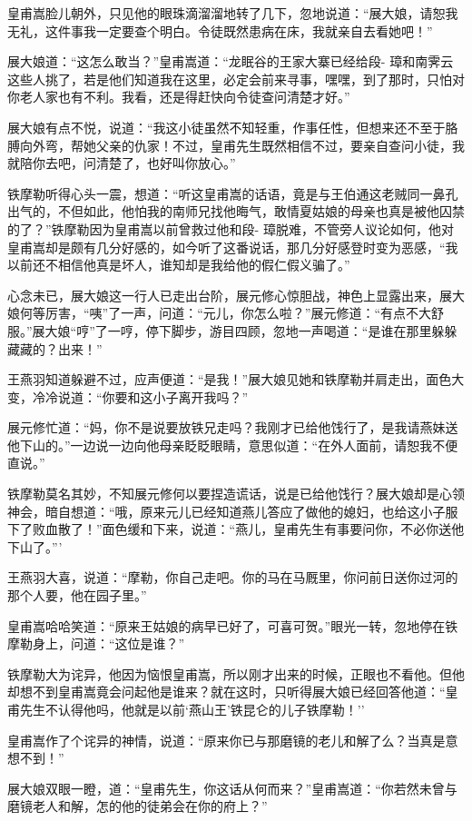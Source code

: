\documentclass[12pt,oneside]{book}
\begin{document}
皇甫嵩脸儿朝外，只见他的眼珠滴溜溜地转了几下，忽地说道：``展大娘，请恕我无礼，这件事我一定要查个明白。令徒既然患病在床，我就亲自去看她吧！''

展大娘道：``这怎么敢当？''皇甫嵩道：``龙眠谷的王家大寨已经给段-
璋和南霁云这些人挑了，若是他们知道我在这里，必定会前来寻事，嘿嘿，到了那时，只怕对你老人家也有不利。我看，还是得赶快向令徒查问清楚才好。''

展大娘有点不悦，说道：``我这小徒虽然不知轻重，作事任性，但想来还不至于胳膊向外弯，帮她父亲的仇家！不过，皇甫先生既然相信不过，要亲自查问小徒，我就陪你去吧，问清楚了，也好叫你放心。''

铁摩勒听得心头一震，想道：``听这皇甫嵩的话语，竟是与王伯通这老贼同一鼻孔出气的，不但如此，他怕我的南师兄找他晦气，敢情夏姑娘的母亲也真是被他囚禁的了？''铁摩勒因为皇甫嵩以前曾救过他和段-
璋脱难，不管旁人议论如何，他对皇甫嵩却是颇有几分好感的，如今听了这番说话，那几分好感登时变为恶感，``我以前还不相信他真是坏人，谁知却是我给他的假仁假义骗了。''

心念未已，展大娘这一行人已走出台阶，展元修心惊胆战，神色上显露出来，展大娘何等厉害，``咦''了一声，问道：``元儿，你怎么啦？''展元修道：``有点不大舒服。''展大娘``哼''了一哼，停下脚步，游目四顾，忽地一声喝道：``是谁在那里躲躲藏藏的？出来！''

王燕羽知道躲避不过，应声便道：``是我！''展大娘见她和铁摩勒并肩走出，面色大变，冷冷说道：``你要和这小子离开我吗？''

展元修忙道：``妈，你不是说要放铁兄走吗？我刚才已给他饯行了，是我请燕妹送他下山的。''一边说一边向他母亲眨眨眼睛，意思似道：``在外人面前，请恕我不便直说。''

铁摩勒莫名其妙，不知展元修何以要捏造谎话，说是已给他饯行？展大娘却是心领神会，暗自想道：``哦，原来元儿已经知道燕儿答应了做他的媳妇，也给这小子服下了败血散了！''面色缓和下来，说道：``燕儿，皇甫先生有事要问你，不必你送他下山了。'''

王燕羽大喜，说道：``摩勒，你自己走吧。你的马在马厩里，你问前日送你过河的那个人要，他在园子里。''

皇甫嵩哈哈笑道：``原来王姑娘的病早已好了，可喜可贺。''眼光一转，忽地停在铁摩勒身上，问道：``这位是谁？''

铁摩勒大为诧异，他因为恼恨皇甫嵩，所以刚才出来的时候，正眼也不看他。但他却想不到皇甫嵩竟会问起他是谁来？就在这时，只听得展大娘已经回答他道：``皇甫先生不认得他吗，他就是以前`燕山王'铁昆仑的儿子铁摩勒！''

皇甫嵩作了个诧异的神情，说道：``原来你已与那磨镜的老儿和解了么？当真是意想不到！''

展大娘双眼一瞪，道：``皇甫先生，你这话从何而来？''皇甫嵩道：``你若然未曾与磨镜老人和解，怎的他的徒弟会在你的府上？''
\end{document}
